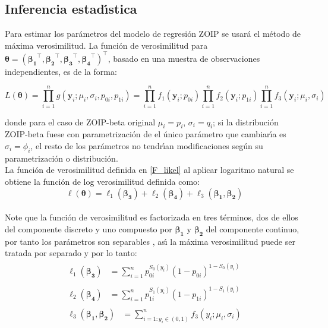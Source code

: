 \subsection{Inferencia estad\'{\i}stica}

Para estimar los par\'{a}metros del modelo de regresi\'{o}n ZOIP se usar\'{a} el m\'{e}todo de m\'{a}xima verosimilitud. La funci\'{o}n de verosimilitud para $\boldsymbol{\theta}=(\boldsymbol{\beta_1}^{\top},\boldsymbol{\beta_2}^{\top},\boldsymbol{\beta_3}^{\top}, \boldsymbol{\beta_4}^{\top})^{\top}$, basado en una muestra de observaciones independientes, es de la forma:

\begin{equation}
L(\boldsymbol{\theta})=\prod_{i=1}^{n}g(\mathbf{y}_i;\mu_i,\sigma_i,p_{0i},p_{1i})=\prod_{i=1}^{n}f_1(\mathbf{y}_i;p_{0i})\prod_{i=1}^{n}f_2(\mathbf{y}_i;p_{1i})\prod_{i=1}^{n}f_3(\mathbf{y}_i;\mu_i,\sigma_i)
\label{F_likel}
\end{equation}


donde para el caso de ZOIP-beta original $\mu_i=p_i$, $\sigma_i=q_i$; si la distribuci\'{o}n ZOIP-beta fuese con parametrizaci\'{o}n de \cite{Ferrari2} el \'{u}nico par\'{a}metro que cambiar\'{\i}a es $\sigma_i=\phi_i$, el resto de los par\'{a}metros no tendr\'{\i}an modificaciones seg\'{u}n su parametrizaci\'{o}n o distribuci\'{o}n.\\

La funci\'{o}n de verosimilitud definida en \eqref{F_likel} al aplicar logaritmo natural se obtiene la funci\'{o}n de log verosimilitud definida como:
\[
\ell(\boldsymbol{\theta})=\ell_1(\boldsymbol{\beta_3})+\ell_2(\boldsymbol{\beta_4})+\ell_3(\boldsymbol{\beta_1},\boldsymbol{\beta_2})
\]
\\
Note que la funci\'{o}n de verosimilitud es factorizada en tres t\'{e}rminos, dos de ellos del componente discreto y uno compuesto por $\boldsymbol{\beta_1}$ y $\boldsymbol{\beta_2}$ del componente continuo, por tanto los par\'{a}metros son separables \citep{Pace1}, as\'{\i} la m\'{a}xima verosimilitud puede ser tratada por separado y por lo tanto:\\
\begin{align*}
\begin{split}
	\ell_1(\boldsymbol{\beta_3}) &= \sum_{i=1}^{n}{p_{0i}^{S_0(y_i)}(1-p_{0i})^{1-S_0(y_i)}}
\end{split}\\
\begin{split}
	\ell_2(\boldsymbol{\beta_4}) &= \sum_{i=1}^{n}{p_{1i}^{S_1(y_i)}(1-p_{1i})^{1-S_1(y_i)}}
\end{split}\\
\begin{split}
	\ell_3(\boldsymbol{\beta_1},\boldsymbol{\beta_2}) &= \sum_{i=1:y_i \in (0,1)}^{n}{f_3(y_i;\mu_i,\sigma_i)} 
\end{split}
\end{align*}

